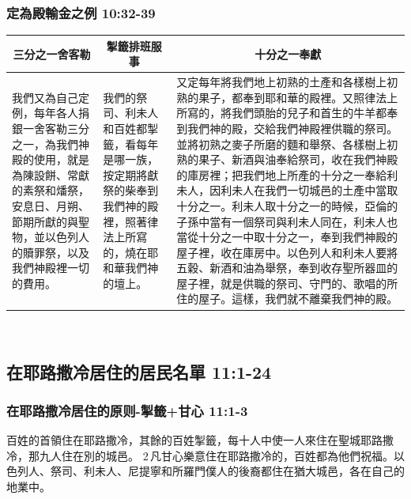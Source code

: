 \subsubsection{定為殿輸金之例 10:32-39}
\begin{table}[H]
\centering
\begin{tabular}{p{3.15cm}|p{2.5cm}|p{10.75cm}}\hline\hline
\multicolumn{1}{c|}{三分之一舍客勒}&\multicolumn{1}{c|}{掣籤排班服事}&\multicolumn{1}{c}{十分之一奉獻}\\\hline
我們又為自己定例，每年各人捐銀一舍客勒三分之一，為我們神殿的使用，就是為陳設餅、常獻的素祭和燔祭，安息日、月朔、節期所獻的與聖物，並以色列人的贖罪祭，以及我們神殿裡一切的費用。
&我們的祭司、利未人和百姓都掣籤，看每年是哪一族，按定期將獻祭的柴奉到我們神的殿裡，照著律法上所寫的，燒在耶和華我們神的壇上。 
&又定每年將我們地上初熟的土產和各樣樹上初熟的果子，都奉到耶和華的殿裡。又照律法上所寫的，將我們頭胎的兒子和首生的牛羊都奉到我們神的殿，交給我們神殿裡供職的祭司。並將初熟之麥子所磨的麵和舉祭、各樣樹上初熟的果子、新酒與油奉給祭司，收在我們神殿的庫房裡；把我們地上所產的十分之一奉給利未人，因利未人在我們一切城邑的土產中當取十分之一。利未人取十分之一的時候，亞倫的子孫中當有一個祭司與利未人同在，利未人也當從十分之一中取十分之一，奉到我們神殿的屋子裡，收在庫房中。以色列人和利未人要將五穀、新酒和油為舉祭，奉到收存聖所器皿的屋子裡，就是供職的祭司、守門的、歌唱的所住的屋子。這樣，我們就不離棄我們神的殿。\\\hline
\end{tabular}
\end{table} 

\subsection{在耶路撒冷居住的居民名單 11:1-24}
\subsubsection{在耶路撒冷居住的原则-掣籤+甘心 11:1-3}
百姓的首領住在耶路撒冷，其餘的百姓掣籤，每十人中使一人來住在聖城耶路撒冷，那九人住在別的城邑。 2 凡甘心樂意住在耶路撒冷的，百姓都為他們祝福。以色列人、祭司、利未人、尼提寧和所羅門僕人的後裔都住在猶大城邑，各在自己的地業中。

